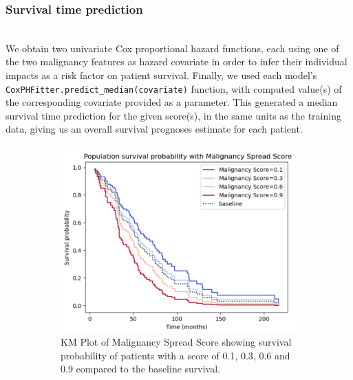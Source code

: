 \documentclass{l4proj}
\begin{document}
\subsubsection{Survival time prediction}\hfill \\
We obtain two univariate Cox proportional hazard functions, each using one of the two malignancy features as hazard covariate in order to infer their individual impacts as a risk factor on patient survival. Finally, we used each model's \texttt{CoxPHFitter.predict\_median(covariate)} function, with computed value(s) of the corresponding covariate provided as a parameter. This generated a median survival time prediction for the given score(s), in the same units as the training data, giving us an overall survival prognoses estimate for each patient. 

\begin{figure}[h]
    \centering
    \begin{subfigure}[b]{0.45\textwidth}
        \includegraphics[scale=0.25]{images/binary-km.png}
        \caption{KM Plot of Malignancy Spread Score showing survival probability of patients with a score of 0.1, 0.3, 0.6 and 0.9 compared to the baseline survival. }
        \label{fig:binary-map}
    \end{subfigure}\hfill%
    ~
    \begin{subfigure}[b]{0.45\textwidth}

\end{subfigure}
\end{figure}
\end{document}

